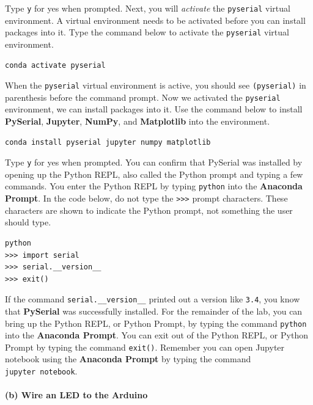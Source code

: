 \documentclass[11pt]{article}
\begin{document}
Type \texttt{y} for yes when prompted. Next, you will \emph{activate}
the \texttt{pyserial} virtual environment. A virtual environment needs
to be activated before you can install packages into it. Type the
command below to activate the \texttt{pyserial} virtual environment.

\begin{verbatim}
conda activate pyserial
\end{verbatim}

When the \texttt{pyserial} virtual environment is active, you should see
\texttt{(pyserial)} in parenthesis before the command prompt. Now we
activated the \texttt{pyserial} environment, we can install packages
into it. Use the command below to install \textbf{PySerial},
\textbf{Jupyter}, \textbf{NumPy}, and \textbf{Matplotlib} into the
environment.

\begin{verbatim}
conda install pyserial jupyter numpy matplotlib
\end{verbatim}

Type \texttt{y} for yes when prompted. You can confirm that PySerial was
installed by opening up the Python REPL, also called the Python prompt
and typing a few commands. You enter the Python REPL by typing
\texttt{python} into the \textbf{Anaconda Prompt}. In the code below, do
not type the \texttt{\textgreater{}\textgreater{}\textgreater{}} prompt
characters. These characters are shown to indicate the Python prompt,
not something the user should type.

\begin{verbatim}
python
>>> import serial
>>> serial.__version__
>>> exit()
\end{verbatim}

If the command \texttt{serial.\_\_version\_\_} printed out a version
like \texttt{\textquotesingle{}3.4\textquotesingle{}}, you know that
\textbf{PySerial} was successfully installed. For the remainder of the
lab, you can bring up the Python REPL, or Python Prompt, by typing the
command \texttt{python} into the \textbf{Anaconda Prompt}. You can exit
out of the Python REPL, or Python Prompt by typing the command
\texttt{exit()}. Remember you can open Jupyter notebook using the
\textbf{Anaconda Prompt} by typing the command
\texttt{jupyter\ notebook}.

    \hypertarget{b-wire-an-led-to-the-arduino}{%
\paragraph{(b) Wire an LED to the
Arduino}\label{b-wire-an-led-to-the-arduino}}
\end{document}
